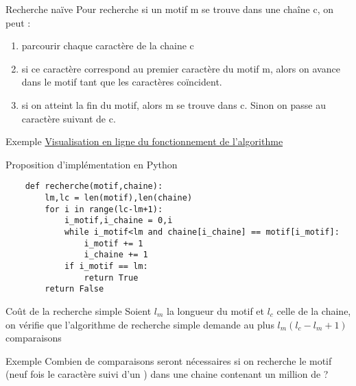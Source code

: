 \documentclass[10pt]{beamer}
\begin{document}
\begin{frame}{\Ctitle}{\stitle}
	\begin{block}{Recherche naïve}
		Pour recherche si un motif {\pmc m} se trouve dans une chaîne {\pmc c}, on peut :
		\begin{enumerate}
			\item<1-> parcourir chaque caractère de la chaine {\pmc c}
			\item<2-> si ce caractère correspond au premier caractère du motif {\pmc m},  alors on avance dans le motif tant que les caractères coïncident.
			\item<3-> si on atteint la fin du motif, alors {\pmc m} se trouve dans {\pmc c}. Sinon on passe au caractère suivant de {\pmc c}.
		\end{enumerate}
	\end{block}
	\begin{exampleblock}{Exemple}
		\href{https://boyer-moore.codekodo.net/recherche_naive.php}{Visualisation en ligne du fonctionnement de l'algorithme}
	\end{exampleblock}
\end{frame}

\begin{frame}[fragile]{\Ctitle}{\stitle}
	\begin{block}{Proposition d'implémentation en Python}
		\begin{lstlisting}
	def recherche(motif,chaine):
		lm,lc = len(motif),len(chaine)
		for i in range(lc-lm+1):
			i_motif,i_chaine = 0,i
			while i_motif<lm and chaine[i_chaine] == motif[i_motif]:
				i_motif += 1
				i_chaine += 1
			if i_motif == lm:
				return True
		return False
		\end{lstlisting}
	\end{block}
\end{frame}

\begin{frame}{\Ctitle}{\stitle}
	\begin{block}{Coût de la recherche simple}
		Soient $l_m$ la longueur du motif et $l_c$ celle de la chaine, on vérifie que l'algorithme de recherche simple demande au plus $l_m(l_c-l_m+1)$ comparaisons
	\end{block}
	\begin{exampleblock}{Exemple}
		Combien de comparaisons seront nécessaires si on recherche le motif  (neuf fois le caractère  suivi d'un ) dans une chaine contenant un million de  ?
	\end{exampleblock}
\end{frame}
\end{document}
